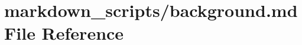 \hypertarget{background_8md}{\section{markdown\-\_\-scripts/background.md File Reference}
\label{background_8md}
}
